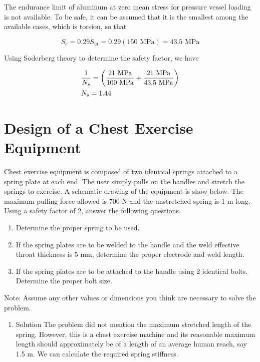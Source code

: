 \documentclass[a4paper,openany,12pt]{book}
\begin{document}
{{\begin{enumerate}
\begin{enumerate}
The endurance limit of aluminum at zero mean stress for pressure
vessel loading is not available. To be safe, it can be assumed that
it is the smallest among the available cases, which is torsion, so
that

$$S_e = 0.29S _{ut} = 0.29(150\text{ MPa}) = 43.5\text{ MPa}$$

Using Soderberg theory to determine the safety factor, we have

$$\begin{gathered}
         \frac{1}{N_s} = \left( \frac{21\text{ MPa}}{100\text{ MPa}} + \frac{21\text{ MPa}}{43.5\text{ MPa}} \right) \hfill \\
         N_s = 1.44 \hfill \\ 
       \end{gathered}$$
\end{enumerate}
\end{enumerate}

\section{Design of a Chest Exercise Equipment}
\label{sec:org51c938f}
Chest exercise equipment is composed of two identical springs attached
to a spring plate at each end. The user simply pulls on the handles and
stretch the springs to exercise. A schematic drawing of the equipment is
show below. The maximum pulling force allowed is 700 N and the
unstretched spring is 1 m long. Using a safety factor of 2, answer the
following questions.



\begin{enumerate}
\item Determine the proper spring to be used.

\item If the spring plates are to be welded to the handle and the weld
effective throat thickness is 5 mm, determine the proper electrode
and weld length.

\item If the spring plates are to be attached to the handle using 2
identical bolts. Determine the proper bolt size.
\end{enumerate}

Note: Assume any other values or dimensions you think are necessary to
solve the problem.

\begin{enumerate}
\item Solution
\label{sec:orga4fd3a2}
The problem did not mention the maximum stretched length of the spring.
However, this is a chest exercise machine and its reasonable maximum
length should approximately be of a length of an average human reach,
say 1.5 m. We can calculate the required spring stiffness.


\end{enumerate}}}
\end{document}
